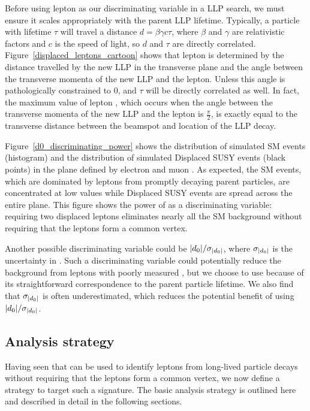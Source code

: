 Before using lepton \ad as our discriminating variable in a LLP search, we must ensure it scales appropriately with the parent LLP lifetime. Typically, a particle with lifetime $\tau$ will travel a distance $d=\beta\gamma c \tau$, where $\beta$ and $\gamma$ are relativistic factors and $c$ is the speed of light, so $d$ and $\tau$ are directly correlated. Figure~\ref{displaced_leptons_cartoon} shows that lepton \ad is determined by the distance travelled by the new LLP in the transverse plane and the angle between the transverse momenta of the new LLP and the lepton. Unless this angle is pathologically constrained to \num{0}, \ad and $\tau$ will be directly correlated as well. In fact, the maximum value of lepton \ad, which occurs when the angle between the transverse momenta of the new LLP and the lepton is $\frac{\pi}{2}$, is exactly equal to the transverse distance between the beamspot and location of the LLP decay.

Figure~\ref{d0_discriminating_power} shows the distribution of simulated SM events (histogram) and the distribution of simulated Displaced SUSY events (black points) in the plane defined by electron and muon \ad. As expected, the SM events, which are dominated by leptons from promptly decaying parent particles, are concentrated at low \ad values while Displaced SUSY events are spread across the entire plane. This figure shows the power of \ad as a discriminating variable: requiring two displaced leptons eliminates nearly all the SM background without requiring that the leptons form a common vertex.

Another possible discriminating variable could be $\lvert d_0 \rvert/\sigma_{\lvert d_0 \rvert}$, where $\sigma_{\lvert d_0 \rvert}$ is the uncertainty in \ad. Such a discriminating variable could potentially reduce the background from leptons with poorly measured \ad, but we choose to use \ad because of its straightforward correspondence to the parent particle lifetime. We also find that $\sigma_{\lvert d_0 \rvert}$ is often underestimated, which reduces the potential benefit of using $\lvert d_0 \rvert/\sigma_{\lvert d_0 \rvert}$.



\subsection{Analysis strategy}
Having seen that \ad can be used to identify leptons from long-lived particle decays without requiring that the leptons form a common vertex, we now define a strategy to target such a signature. The basic analysis strategy is outlined here and described in detail in the following sections.

